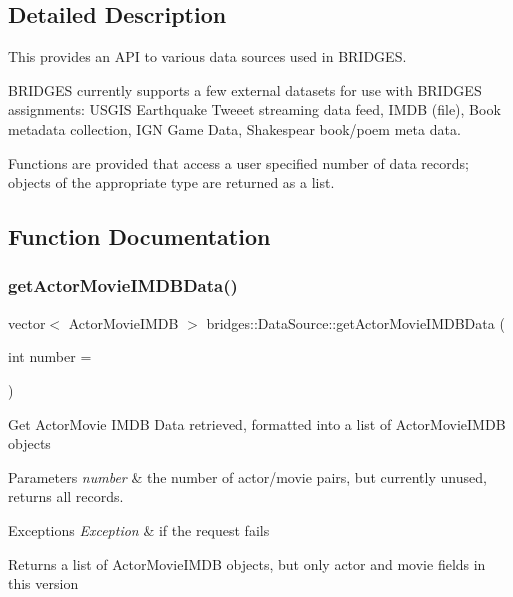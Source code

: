 \subsection{Detailed Description}
This provides an A\+PI to various data sources used in B\+R\+I\+D\+G\+ES. 

B\+R\+I\+D\+G\+ES currently supports a few external datasets for use with B\+R\+I\+D\+G\+ES assignments\+: U\+S\+G\+IS Earthquake Tweeet streaming data feed, I\+M\+DB (file), Book metadata collection, I\+GN Game Data, Shakespear book/poem meta data.

Functions are provided that access a user specified number of data records; objects of the appropriate type are returned as a list. 

\subsection{Function Documentation}
\mbox{\label{namespacebridges_1_1_data_source_ac43ccd8f2a325cf2f057a5ee7f0b73f1}} 
\subsubsection{\texorpdfstring{get\+Actor\+Movie\+I\+M\+D\+B\+Data()}{getActorMovieIMDBData()}}
{\footnotesize\ttfamily vector$<$ Actor\+Movie\+I\+M\+DB $>$ bridges\+::\+Data\+Source\+::get\+Actor\+Movie\+I\+M\+D\+B\+Data (\begin{DoxyParamCaption}\item[{int}]{number = {} }\end{DoxyParamCaption})}

Get Actor\+Movie I\+M\+DB Data retrieved, formatted into a list of Actor\+Movie\+I\+M\+DB objects


\begin{DoxyParams}{Parameters}
{\em number} & the number of actor/movie pairs, but currently unused, returns all records. \\
\hline
\end{DoxyParams}

\begin{DoxyExceptions}{Exceptions}
{\em Exception} & if the request fails\\
\hline
\end{DoxyExceptions}
\begin{DoxyReturn}{Returns}
a list of Actor\+Movie\+I\+M\+DB objects, but only actor and movie fields in this version 
\end{DoxyReturn}
\mbox{\label{namespacebridges_1_1_data_source_a022113cbb28042171d088250e85098d0}} 
